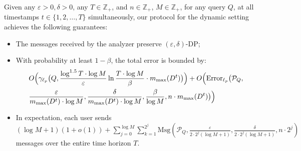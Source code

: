 \begin{theorem}
\label{the: dynamic setting guarantee}
    Given any $\varepsilon > 0, \delta > 0$, any $T \in \mathbb{Z}_+$, and $n \in \mathbb{Z}_+$, $M \in \mathbb{Z}_+$, for any query $Q$, at all timestamps $t \in \{1, 2, \dots, T\}$ simultaneously, our protocol for the dynamic setting achieves the following guarantees:
\begin{itemize}
    \item The messages received by the analyzer preserve $(\varepsilon,\delta)$-DP;
    \item With probability at least $1-\beta$, the total error is bounded by:
    \[
    \begin{aligned}
    &O\Big(\gamma_{\ell_p}\big( Q, \frac{\log ^{1.5} T \cdot \log M}{\varepsilon} \ln \frac{T \cdot \log M}{\beta} \cdot m_{\max}(D^t)\big)\Big) + O\Big(\mathrm{Error}_{\ell_p}\big(\mathcal{P}_Q,
    \\
    & \frac{\varepsilon}{m_{\max}(D^t) \cdot \log M}, \frac{\delta}{m_{\max}(D^t) \cdot \log M}, \frac{\beta}{\log M}, n \cdot m_{\max}(D^t)\big)\Big)
    \end{aligned}
    \]
    \item In expectation, each user sends $(\log M+1)(1+o(1)) + \sum_{j=0}^{\log M} \sum_{k=1}^{2^j} \mathrm{Msg}(\mathcal{P}_Q, \frac{\varepsilon}{2\cdot 2^j(\log M+1)}, \frac{\delta}{2\cdot 2^j(\log M+1)}, n \cdot 2^j)$ messages over the entire time horizon $T$.
\end{itemize}
\end{theorem}

